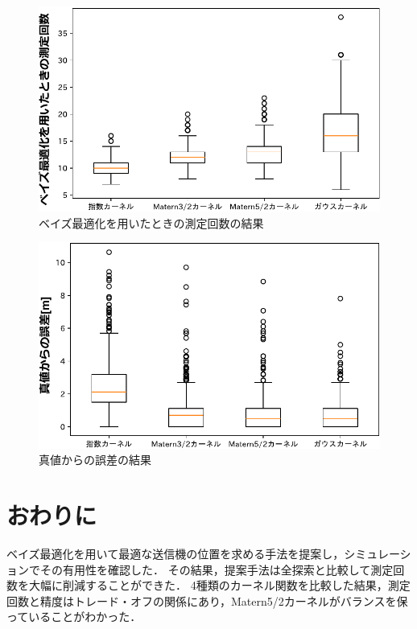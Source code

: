 \documentclass[twocolumn]{ltjarticle}
\begin{document}
\setlength\intextsep{3pt}
\setlength\textfloatsep{3pt}
\begin{figure}[H]
	\centering
	\includegraphics[width=0.87\linewidth]{./figures/material_8_count_box.pdf}
	\vspace*{-0.4cm}
	\caption{ベイズ最適化を用いたときの測定回数の結果} \label{fig:result_count}
\end{figure}
\vspace*{-0.1cm}
\begin{figure}[H]
	\centering
	\includegraphics[width=0.87\linewidth]{./figures/material_8_distance_box.pdf}
	\vspace*{-0.4cm}
	\caption{真値からの誤差の結果} \label{fig:result_error}
\end{figure}

\section{おわりに}

ベイズ最適化を用いて最適な送信機の位置を求める手法を提案し，シミュレーションでその有用性を確認した．
その結果，提案手法は全探索と比較して測定回数を大幅に削減することができた．
4種類のカーネル関数を比較した結果，測定回数と精度はトレード・オフの関係にあり，Matern5/2カーネルがバランスを保っていることがわかった．

\vspace{2mm}

\begin{spacing}{0.65}
	\printbibliography[title=参考文献]
\end{spacing}
\end{document}
